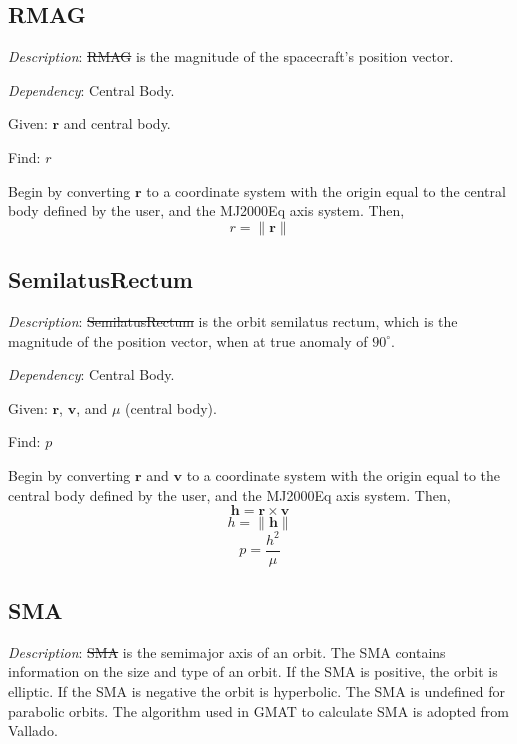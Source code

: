\subsection{RMAG} 

\noindent \textit{Description}: \st{RMAG} is the magnitude of the
spacecraft's position vector.

\noindent \textit{Dependency}:  Central Body.

\noindent Given:  $\mathbf{r}$ and central body.

\noindent Find:  $r$

Begin by converting $\mathbf{r}$  to a coordinate system with the
origin equal to the central body defined by the user, and the
MJ2000Eq axis system.  Then,
%
\begin{equation}
    r = \| \mathbf{r} \|
\end{equation}

\subsection{SemilatusRectum} 

\noindent \textit{Description}: \st{SemilatusRectum} is the orbit
semilatus rectum, which is the magnitude of the position vector,
when at true anomaly of $90^{\circ}$.

\noindent \textit{Dependency}:  Central Body.

\noindent Given:  $\mathbf{r}$, $\mathbf{v}$, and $\mu$ (central
body).

\noindent Find:  $p$

Begin by converting $\mathbf{r}$ and $\mathbf{v}$ to a coordinate
system with the origin equal to the central body defined by the
user, and the MJ2000Eq axis system.  Then,
%
\begin{equation}
    \mathbf{h} = \mathbf{r} \times \mathbf{v}
\end{equation}
%
\begin{equation}
    h = \| \mathbf{h} \|
\end{equation}
%
\begin{equation}
    p = \frac{h^2}{\mu}
\end{equation}


\subsection{SMA} 

\noindent \textit{Description}: \st{SMA} is the semimajor axis  of
an orbit. The SMA contains information on the size and type of an
orbit.  If the SMA is positive, the orbit is elliptic.  If the SMA
is negative the orbit is hyperbolic.  The SMA is undefined for
parabolic orbits. The algorithm used in GMAT to calculate SMA is
adopted from Vallado\cite{vallado2}.

